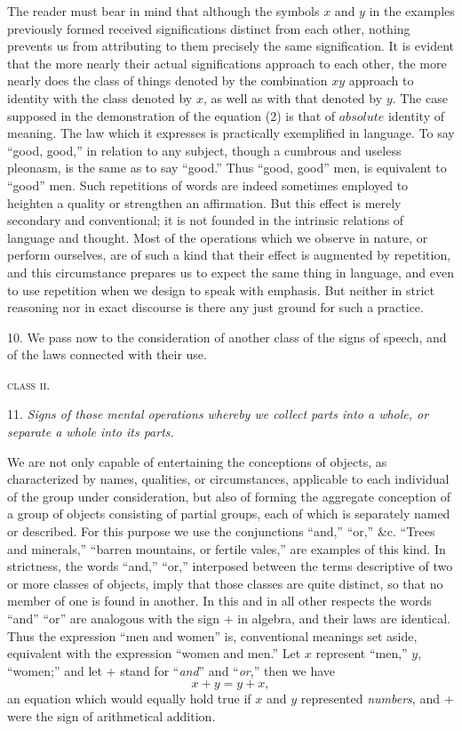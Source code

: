 \documentclass[oneside]{book}
\begin{document}
The reader must bear in mind that although the symbols $x$
and $y$ in the examples previously formed received significations
distinct from each other, nothing prevents us from attributing to
them precisely the same signification. It is evident that the
more nearly their actual significations approach to each other,
the more nearly does the class of things denoted by the combination
$xy$ approach to identity with the class denoted by $x$, as
well as with that denoted by $y$. The case supposed in the demonstration
of the equation (2) is that of $absolute$ identity of
meaning. The law which it expresses is practically exemplified
in language. To say ``good, good,'' in relation to any subject,
though a cumbrous and useless pleonasm, is the same as to say
``good.'' Thus ``good, good'' men, is equivalent to ``good''
men. Such repetitions of words are indeed sometimes employed
to heighten a quality or strengthen an affirmation. But this
effect is merely secondary and conventional; it is not founded in
the intrinsic relations of language and thought. Most of the
operations which we observe in nature, or perform ourselves, are
of such a kind that their effect is augmented by repetition, and
this circumstance prepares us to expect the same thing in language,
and even to use repetition when we design to speak with
emphasis. But neither in strict reasoning nor in exact discourse
is there any just ground for such a practice.

10. We pass now to the consideration of another class of the
signs of speech, and of the laws connected with their use.

\begin{center}
\textsc {class ii}.
\end{center}

11. \textit{Signs of those mental operations whereby we collect parts
into a whole, or separate a whole into its parts.}

We are not only capable of entertaining the conceptions of
objects, as characterized by names, qualities, or circumstances,
applicable to each individual of the group under consideration,
but also of forming the aggregate conception of a group of objects
consisting of partial groups, each of which is separately named
or described. For this purpose we use the conjunctions ``and,''
``or,'' \&c. ``Trees and minerals,'' ``barren mountains, or fertile
vales,'' are examples of this kind. In strictness, the words
``and,'' ``or,'' interposed between the terms descriptive of two or
more classes of objects, imply that those classes are quite distinct,
so that no member of one is found in another. In this and in
all other respects the words ``and'' ``or'' are analogous with the
sign $+$ in algebra, and their laws are identical. Thus the expression
``men and women'' is, conventional meanings set aside,
equivalent with the expression ``women and men.'' Let $x$ represent
``men,'' $y$, ``women;'' and let $+$ stand for ``\textit{and}'' and ``\textit{or},''
then we have
\begin{equation}
x + y = y + x,
\end{equation}
an equation which would equally hold true if $x$ and $y$ represented
\textit{numbers}, and $+$ were the sign of arithmetical addition.
\end{document}
